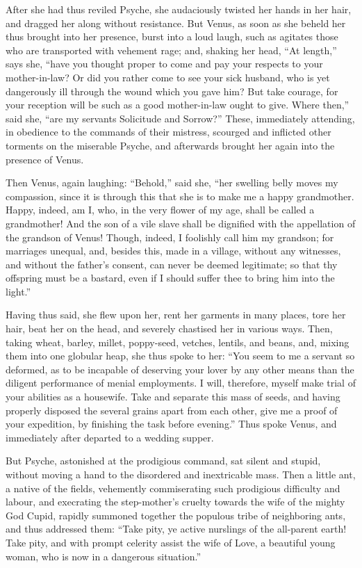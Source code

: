 \documentclass[12pt]{article}
\begin{document}
After she had thus reviled Psyche, she audaciously twisted her hands in her
hair, and dragged her along without resistance. But Venus, as soon as she
beheld her thus brought into her presence, burst into a loud laugh, such as
agitates those who are transported with vehement rage; and, shaking her head,
``At length,'' says she, ``have you thought proper to come and pay your
respects to your mother-in-law? Or did you rather come to see your sick
husband, who is yet dangerously ill through the wound which you gave him? But
take courage, for your reception will be such as a good mother-in-law ought to
give. Where then,'' said she, ``are my servants Solicitude and Sorrow?'' These,
immediately attending, in obedience to the commands of their mistress, scourged
and inflicted other torments on the miserable Psyche, and afterwards brought
her again into the presence of Venus.

Then Venus, again laughing: ``Behold,'' said she, ``her swelling belly moves my
compassion, since it is through this that she is to make me a happy
grandmother. Happy, indeed, am I, who, in the very flower of my age, shall be
called a grandmother! And the son of a vile slave shall be dignified with the
appellation of the grandson of Venus! Though, indeed, I foolishly call him my
grandson; for marriages unequal, and, besides this, made in a village, without
any witnesses, and without the father's consent, can never be deemed
legitimate; so that thy offspring must be a bastard, even if I should suffer
thee to bring him into the light.''

Having thus said, she flew upon her, rent her garments in many places, tore her
hair, beat her on the head, and severely chastised her in various ways. Then,
taking wheat, barley, millet, poppy-seed, vetches, lentils, and beans, and,
mixing them into one globular heap, she thus spoke to her: ``You seem to me a
servant so deformed, as to be incapable of deserving your lover by any other
means than the diligent performance of menial employments. I will, therefore,
myself make trial of your abilities as a housewife. Take and separate this mass
of seeds, and having properly disposed the several grains apart from each
other, give me a proof of your expedition, by finishing the task before
evening.'' Thus spoke Venus, and immediately after departed to a wedding
supper.

But Psyche, astonished at the prodigious command, sat silent and stupid,
without moving a hand to the disordered and inextricable mass. Then a little
ant, a native of the fields, vehemently commiserating such prodigious
difficulty and labour, and execrating the step-mother's cruelty towards the
wife of the mighty God Cupid, rapidly summoned together the populous tribe of
neighboring ants, and thus addressed them: ``Take pity, ye active nurslings of
the all-parent earth! Take pity, and with prompt celerity assist the wife of
Love, a beautiful young woman, who is now in a dangerous situation.''
\end{document}
